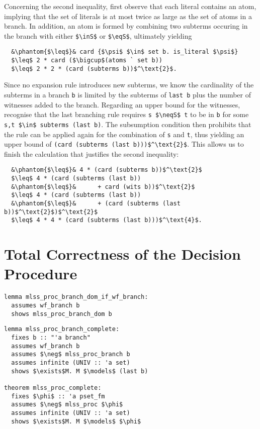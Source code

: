 \documentclass[sigplan,10pt,anonymous,review]{acmart}
\newcommand{\inS}{\in_\text{s}}
\newcommand{\eqS}{=_\text{s}}
\newcommand{\neqS}{\neq_\text{s}}
\begin{document}
Concerning the second inequality, first observe that each literal contains an atom, implying that the set of literals is at most twice as large as the set of atoms in a branch. 
In addition, an atom is formed by combining two subterms occuring in the branch with either \lstinline!$\inS$! or \lstinline!$\eqS$!, ultimately yielding
\begin{lstlisting}
  &\phantom{$\leq$}& card {$\psi$ $\in$ set b. is_literal $\psi$}
  $\leq$ 2 * card ($\bigcup$(atoms ` set b))
  $\leq$ 2 * 2 * (card (subterms b))$^\text{2}$.
\end{lstlisting}
Since no expansion rule introduces new subterms, we know the cardinality of the subterms in a branch \lstinline!b! is limited by the subterms of \lstinline!last b! plus the number of witnesses added to the branch.
Regarding an upper bound for the witnesses, recognise that the last branching rule requires \lstinline!s $\neqS$ t! to be in \lstinline!b! for some \lstinline!s,t $\in$ subterms (last b)!.
The subsumption condition then prohibits that the rule can be applied again for the combination of \lstinline!s! and \lstinline!t!, thus yielding an upper bound of \lstinline!(card (subterms (last b)))$^\text{2}$!.
This allows us to finish the calculation that justifies the second inequality:
\begin{lstlisting}
  &\phantom{$\leq$}& 4 * (card (subterms b))$^\text{2}$
  $\leq$ 4 * (card (subterms (last b))
  &\phantom{$\leq$}&      + card (wits b))$^\text{2}$
  $\leq$ 4 * (card (subterms (last b))
  &\phantom{$\leq$}&      + (card (subterms (last b))$^\text{2}$)$^\text{2}$
  $\leq$ 4 * 4 * (card (subterms (last b)))$^\text{4}$.
\end{lstlisting}

\section{Total Correctness of the Decision Procedure\label{sec:correct}}

\begin{lstlisting}
lemma mlss_proc_branch_dom_if_wf_branch:
  assumes wf_branch b
  shows mlss_proc_branch_dom b
\end{lstlisting}

\begin{lstlisting}
lemma mlss_proc_branch_complete:
  fixes b :: "'a branch"
  assumes wf_branch b
  assumes $\neg$ mlss_proc_branch b
  assumes infinite (UNIV :: 'a set)
  shows $\exists$M. M $\models$ (last b)

theorem mlss_proc_complete:
  fixes $\phi$ :: 'a pset_fm
  assumes $\neg$ mlss_proc $\phi$
  assumes infinite (UNIV :: 'a set)
  shows $\exists$M. M $\models$ $\phi$
\end{lstlisting}
\end{document}
